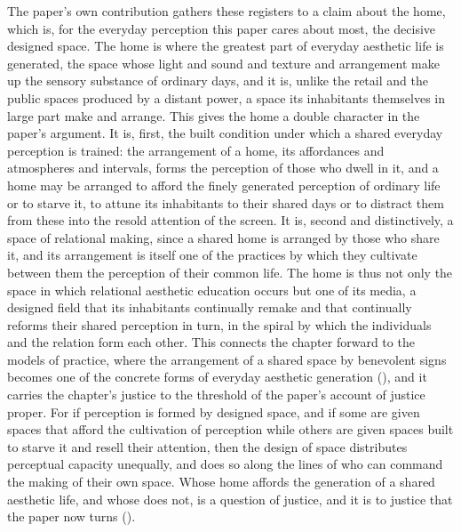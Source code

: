 The paper's own contribution gathers these registers to a claim about the home, which is, for the everyday perception this paper cares about most, the decisive designed space. The home is where the greatest part of everyday aesthetic life is generated, the space whose light and sound and texture and arrangement make up the sensory substance of ordinary days, and it is, unlike the retail and the public spaces produced by a distant power, a space its inhabitants themselves in large part make and arrange. This gives the home a double character in the paper's argument. It is, first, the built condition under which a shared everyday perception is trained: the arrangement of a home, its affordances and atmospheres and intervals, forms the perception of those who dwell in it, and a home may be arranged to afford the finely generated perception of ordinary life or to starve it, to attune its inhabitants to their shared days or to distract them from these into the resold attention of the screen. It is, second and distinctively, a space of relational making, since a shared home is arranged by those who share it, and its arrangement is itself one of the practices by which they cultivate between them the perception of their common life. The home is thus not only the space in which relational aesthetic education occurs but one of its media, a designed field that its inhabitants continually remake and that continually reforms their shared perception in turn, in the spiral by which the individuals and the relation form each other. This connects the chapter forward to the models of practice, where the arrangement of a shared space by benevolent signs becomes one of the concrete forms of everyday aesthetic generation (), and it carries the chapter's justice to the threshold of the paper's account of justice proper. For if perception is formed by designed space, and if some are given spaces that afford the cultivation of perception while others are given spaces built to starve it and resell their attention, then the design of space distributes perceptual capacity unequally, and does so along the lines of who can command the making of their own space. Whose home affords the generation of a shared aesthetic life, and whose does not, is a question of justice, and it is to justice that the paper now turns ().
